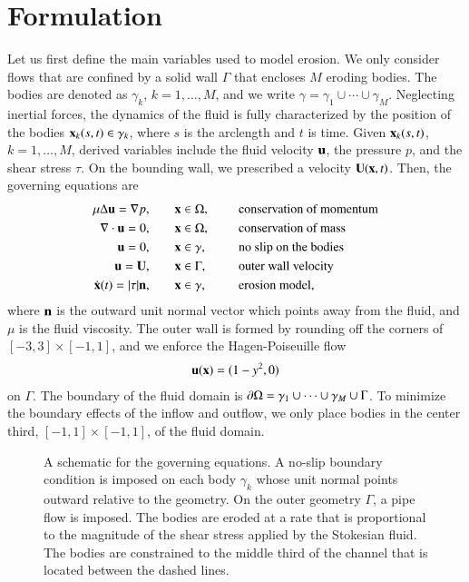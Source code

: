 \documentclass[preprint, 10pt]{elsarticle}
\begin{document}
\section{Formulation\label{s:formulation}} 
Let us first define the main variables used to model erosion.  We only
consider flows that are confined by a solid wall $\Gamma$ that encloses
$M$ eroding bodies.  The bodies are denoted as $\gamma_k$,
$k=1,\ldots,M$, and we write $\gamma = \gamma_1 \cup \cdots \cup
\gamma_M$.  Neglecting inertial forces, the dynamics of the fluid is
fully characterized by the position of the bodies ${\mathbf{x}}_k(s,t) \in
\gamma_k$, where $s$ is the arclength and $t$ is time.  Given
${\mathbf{x}}_k(s,t)$, $k=1,\ldots,M$, derived variables include the fluid
velocity ${\mathbf{u}}$, the pressure $p$, and the shear stress $\tau$.   On the
bounding wall, we prescribed a velocity ${\mathbf{U}}({\mathbf{x}},t)$.  Then, the
governing equations are
\begin{equation}
\label{eqn:erosionModel}
\begin{split}
  \mu \Delta {\mathbf{u}} = {\nabla} p, &\hspace{20pt} {\mathbf{x}} \in \Omega, \hspace*{.2in} &&\mbox{conservation
of momentum}\\
{\nabla} \cdot {\mathbf{u}} = 0, &\hspace{20pt} {\mathbf{x}} \in \Omega, \hspace*{.2in}
&&\mbox{conservation of mass} \\
{\mathbf{u}} = 0, &\hspace{20pt} {\mathbf{x}} \in \gamma, \hspace*{.2in} &&\mbox{no slip on the
bodies} \\
{\mathbf{u}} = {\mathbf{U}}, &\hspace{20pt} {\mathbf{x}} \in \Gamma, \hspace*{.2in} &&\mbox{outer wall
velocity} \\
\dot{{\mathbf{x}}}(t) = \lvert \tau \rvert {\mathbf{n}}, &\hspace{20pt} {\mathbf{x}} \in \gamma,
&&\mbox{erosion model},
\end{split}
\end{equation}
where ${\mathbf{n}}$ is the outward unit normal vector which points away from the
fluid, and $\mu$ is the fluid viscosity.  The outer wall is formed by
rounding off the corners of $[-3,3] \times [-1,1]$, and we enforce the
Hagen-Poiseuille flow
\begin{align*}
  {\mathbf{u}}({\mathbf{x}}) = (1-y^2,0)
\end{align*}
on $\Gamma$.  The boundary of the fluid domain is ${\partial}\Omega = \gamma_1
\cup \cdots \cup \gamma_M \cup \Gamma$.  To minimize the boundary
effects of the inflow and outflow, we only place bodies in the center
third, $[-1,1] \times [-1,1]$, of the fluid domain.
\begin{figure}[htpb]
  \centering
  
  \caption{\label{fig:schematic} A schematic for the governing
    equations.  A no-slip boundary condition is imposed on each body
    $\gamma_k$ whose unit normal points outward relative to the
    geometry.  On the outer geometry $\Gamma$, a pipe flow is imposed.
    The bodies are eroded at a rate that is proportional to the
    magnitude of the shear stress applied by the Stokesian fluid.  The
    bodies are constrained to the middle third of the channel that is
    located between the dashed lines.}
\end{figure}
\end{document}
